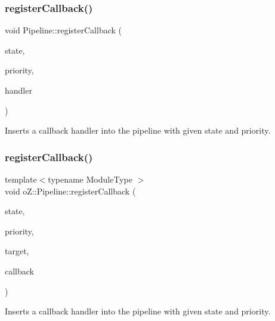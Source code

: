 \subsubsection{\texorpdfstring{registerCallback()}{registerCallback()}\hspace{0.1cm}{\footnotesize\ttfamily [1/2]}}
{\footnotesize\ttfamily void Pipeline\+::register\+Callback (\begin{DoxyParamCaption}\item[{\mbox{\hyperlink{namespaceo_z_a356b278f7c65def0cae75fca8cae268e}{State}}}]{state,  }\item[{\mbox{\hyperlink{namespaceo_z_af05a92eb185d18369e9b4acdcd9dcd12}{Priority}}}]{priority,  }\item[{\mbox{\hyperlink{classo_z_1_1_pipeline_a5a71ea2f2d4be5b82589c1b8175722f4}{Callback\+Handler}} \&\&}]{handler }\end{DoxyParamCaption})}



Inserts a callback handler into the pipeline with given state and priority. 

\mbox{\label{classo_z_1_1_pipeline_af6d96b2697aa6770a3f1dd205b12c1c3}} 
\subsubsection{\texorpdfstring{registerCallback()}{registerCallback()}\hspace{0.1cm}{\footnotesize\ttfamily [2/2]}}
{\footnotesize\ttfamily template$<$typename Module\+Type $>$ \\
void o\+Z\+::\+Pipeline\+::register\+Callback (\begin{DoxyParamCaption}\item[{\mbox{\hyperlink{namespaceo_z_a356b278f7c65def0cae75fca8cae268e}{State}}}]{state,  }\item[{\mbox{\hyperlink{namespaceo_z_af05a92eb185d18369e9b4acdcd9dcd12}{Priority}}}]{priority,  }\item[{Module\+Type $\ast$}]{target,  }\item[{bool(Module\+Type\+::$\ast$)(\mbox{\hyperlink{classo_z_1_1_context}{Context}} \&)}]{callback }\end{DoxyParamCaption})}



Inserts a callback handler into the pipeline with given state and priority. 

